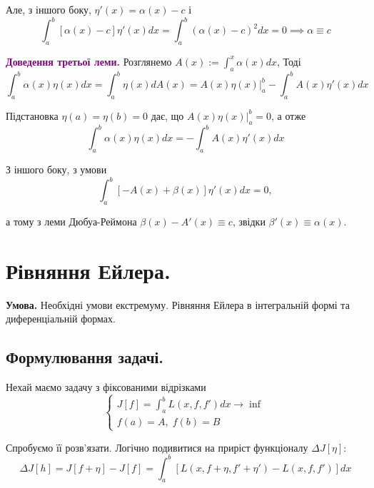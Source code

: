 \documentclass[14pt]{extarticle}
\newcommand{\<}{\langle}
\renewcommand{\>}{\rangle}
\theoremstyle{mystyle}{\newtheorem{definition}{Definition}[section]}
\theoremstyle{mystyle}{\newtheorem{proposition}[definition]{Proposition}}
\theoremstyle{mystyle}{\newtheorem{theorem}[definition]{Theorem}}
\theoremstyle{mystyle}{\newtheorem{lemma}[definition]{Lemma}}
\theoremstyle{mystyle}{\newtheorem{corollary}[definition]{Corollary}}
\theoremstyle{mystyle}{\newtheorem*{remark}{Remark}}
\theoremstyle{mystyle}{\newtheorem*{remarks}{Remarks}}
\theoremstyle{mystyle}{\newtheorem*{example}{Example}}
\theoremstyle{mystyle}{\newtheorem*{examples}{Examples}}
\theoremstyle{definition}{\newtheorem*{exercise}{Exercise}}
\theoremstyle{cstyle}{\newtheorem*{cthm}{}}
\theoremstyle{warn}
\begin{document}
Але, з іншого боку, $\eta'(x)=\alpha(x)-c$ і
\begin{equation}
    \int_a^b [\alpha(x)-c]\eta'(x)dx = \int_a^b (\alpha(x)-c)^2dx = 0 \implies \alpha \equiv c
\end{equation}

\textcolor{purple}{\textbf{Доведення третьої леми.}} Розглянемо $A(x):=\int_a^x \alpha(x)dx$, Тоді
\begin{equation}
    \int_a^b \alpha(x)\eta(x)dx = \int_a^b \eta(x)dA(x) = A(x)\eta(x)\Big|_{a}^b - \int_a^b A(x)\eta'(x)dx
\end{equation}

Підстановка $\eta(a)=\eta(b)=0$ дає, що $A(x)\eta(x)\Big|_{a}^b=0$, а отже 
\begin{equation}
    \int_a^b \alpha(x)\eta(x)dx = -\int_a^b A(x)\eta'(x)dx
\end{equation}

З іншого боку, з умови
\begin{equation}
    \int_a^b[-A(x)+\beta(x)]\eta'(x)dx=0,
\end{equation}

а тому з леми Дюбуа-Реймона $\beta(x)-A'(x) \equiv c$, звідки $\beta'(x) \equiv \alpha(x)$.

\pagebreak

\section{Рівняння Ейлера.}

\textbf{Умова.} Необхідні умови екстремуму. Рівняння Ейлера в інтегральній формі та диференціальній
формах.

\subsection{Формулювання задачі.} 

Нехай маємо задачу з фіксованими відрізками
\begin{equation}
    \begin{cases}
        J[f] = \int_a^b L(x,f,f')dx \to \inf \\
        f(a) = A, \; f(b) = B
    \end{cases}
\end{equation}

Спробуємо її розв'язати. Логічно подивитися на приріст функціоналу $\Delta J[\eta]$:
\begin{equation}
    \Delta J[h] = J[f+\eta] - J[f] = \int_a^b [L(x,f+\eta,f'+\eta')-L(x,f,f')]dx
\end{equation}
\end{document}
